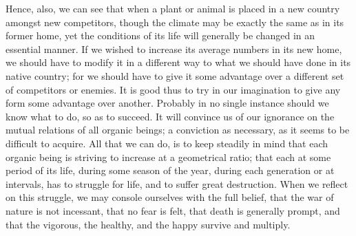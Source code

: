 Hence, also, we can see that when a plant or animal is placed in a new country amongst new competitors, though the climate may be exactly the same as in its former home, yet the conditions of its life will generally be changed in an essential manner. If we wished to increase its average numbers in its new home, we should have to modify it in a different way to what we should have done in its native country; for we should have to give it some advantage over a different set of competitors or enemies.
It is good thus to try in our imagination to give any form some advantage over another. Probably in no single instance should we know what to do, so as to succeed. It will convince us of our ignorance on the mutual relations of all organic beings; a conviction as necessary, as it seems to be difficult to acquire. All that we can do, is to keep steadily in mind that each organic being is striving to increase at a geometrical ratio; that each at some period of its life, during some season of the year, during each generation or at intervals, has to struggle for life, and to suffer great destruction. When we reflect on this struggle, we may console ourselves with the full belief, that the war of nature is not incessant, that no fear is felt, that death is generally prompt, and that the vigorous, the healthy, and the happy survive and multiply. 